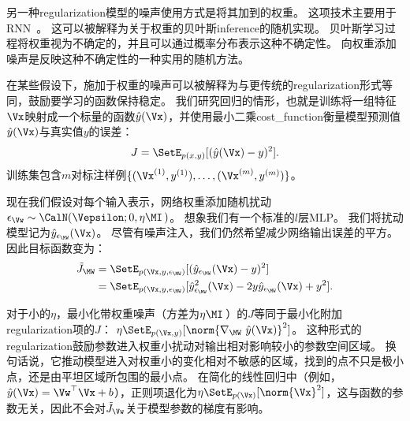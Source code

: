 另一种\gls{regularization}模型的噪声使用方式是将其加到的权重。
这项技术主要用于\gls{RNN}~\citep{Jim-et-al-1996,Graves-2011}。
这可以被解释为关于权重的贝叶斯\gls{inference}的随机实现。
贝叶斯学习过程将权重视为不确定的，并且可以通过概率分布表示这种不确定性。
向权重添加噪声是反映这种不确定性的一种实用的随机方法。

在某些假设下，施加于权重的噪声可以被解释为与更传统的\gls{regularization}形式等同，鼓励要学习的函数保持稳定。
我们研究回归的情形，也就是训练将一组特征$\Vx$映射成一个标量的函数$\hat y(\Vx)$，并使用最小二乘\gls{cost_function}衡量模型预测值$\hat y(\Vx)$与真实值$y$的误差：
\begin{align}
 J = \SetE_{p(x,y)}[(\hat y(\Vx) - y)^2].
\end{align}
训练集包含$m$对标注样例$\{(\Vx^{(1)}, y^{(1)}),\dots,(\Vx^{(m)}, y^{(m)})\}$。

现在我们假设对每个输入表示，网络权重添加随机扰动$\epsilon_{\Vw} \sim \CalN(\Vepsilon;0, \eta\MI \, )$。
想象我们有一个标准的$l$层MLP。
我们将扰动模型记为$\hat y_{\epsilon_{\MW}} (\Vx)$。
尽管有噪声注入，我们仍然希望减少网络输出误差的平方。
因此目标函数变为：
\begin{align}
 \tilde J_{\MW} &= \SetE_{p(\Vx,y,\epsilon_{\MW})}[(\hat y_{\epsilon_{\MW}}(\Vx) - y)^2] \\
   &=  \SetE_{p(\Vx,y,\epsilon_{\MW})}[\hat y_{\epsilon_{\MW}}^2(\Vx) -  2y\hat y_{\epsilon_{\MW}}
   (\Vx)+ y^2] .
\end{align}

对于小的$\eta$，最小化带权重噪声（方差为$\eta \MI$\,）的$J$等同于最小化附加\gls{regularization}项的$J$：
$ \eta \SetE_{p(\Vx,y)}[\norm{\nabla_{\MW}~\hat y(\Vx)}^2]$。
这种形式的\gls{regularization}鼓励参数进入权重小扰动对输出相对影响较小的参数空间区域。
换句话说，它推动模型进入对权重小的变化相对不敏感的区域，找到的点不只是极小点，还是由平坦区域所包围的最小点\citep{Hochreiter-Schmidhuber-1995}。
在简化的线性回归中（例如，$\hat y(\Vx) = \Vw^\top \Vx + b$），正则项退化为$ \eta \SetE_{p(\Vx)}[\norm{\Vx}^2]$，这与函数的参数无关，因此不会对$\tilde J_{\Vw}$关于模型参数的梯度有影响。


